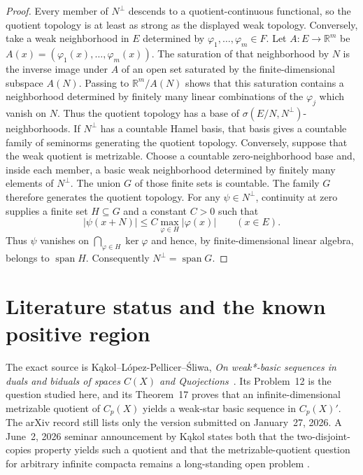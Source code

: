 \documentclass[11pt]{article}
\newcommand{\Cp}{C_p}
\newcommand{\spann}{\operatorname{span}}
\newcommand{\R}{\mathbb{R}}
\begin{document}
\begin{proof}
Every member of $N^\perp$ descends to a quotient-continuous functional, so the
quotient topology is at least as strong as the displayed weak topology.
Conversely, take a weak neighborhood in $E$ determined by
$\varphi_1,\ldots,\varphi_m\in F$.  Let
$A:E\to\R^m$ be $A(x)=(\varphi_1(x),\ldots,\varphi_m(x))$.
The saturation of that neighborhood by $N$ is the inverse image under $A$ of
an open set saturated by the finite-dimensional subspace $A(N)$.  Passing to
$\R^m/A(N)$ shows that this saturation contains a neighborhood determined by
finitely many linear combinations of the $\varphi_j$ which vanish on $N$.
Thus the quotient topology has a base of $\sigma(E/N,N^\perp)$-neighborhoods.
If $N^\perp$ has a countable Hamel basis, that basis gives a countable
family of seminorms generating the quotient topology.  Conversely, suppose
that the weak quotient is metrizable.  Choose a countable zero-neighborhood
base and, inside each member, a basic weak neighborhood determined by finitely
many elements of $N^\perp$.  The union $G$ of those finite sets is countable.
The family $G$ therefore generates the quotient topology.  For any
$\psi\in N^\perp$, continuity at zero supplies a finite set
$H\subseteq G$ and a constant $C>0$ such that
\[
 |\psi(x+N)|\leq C\max_{\varphi\in H}|\varphi(x)|
 \qquad(x\in E).
\]
Thus $\psi$ vanishes on $\bigcap_{\varphi\in H}\ker\varphi$ and hence, by
finite-dimensional linear algebra, belongs to $\spann H$.  Consequently
$N^\perp=\spann G$.
\end{proof}

\section{Literature status and the known positive region}\label{sec:literature}

The exact source is K\k{a}kol--L\'opez-Pellicer--\'Sliwa,
\emph{On weak*-basic sequences in duals and biduals of spaces $C(X)$ and
Quojections}~\cite{KLS2026}.  Its Problem~12 is the question studied here, and
its Theorem~17 proves that an infinite-dimensional metrizable quotient of
$\Cp(X)$ yields a weak-star basic sequence in $\Cp(X)'$.  The arXiv record
still lists only the version submitted on January~27, 2026.  A June~2, 2026
seminar announcement by K\k{a}kol states both that the two-disjoint-copies
property yields such a quotient and that the metrizable-quotient question for
arbitrary infinite compacta remains a long-standing open problem
\cite{KakolSeminar2026}.
\end{document}
